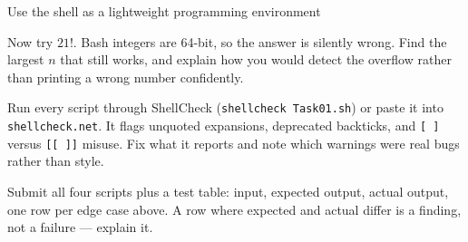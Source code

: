 \begin{labproject}{Use the shell as a lightweight programming environment}
\begin{tryit}
Now try $21!$. Bash integers are 64-bit, so the answer is silently wrong. Find the largest $n$ that still works, and explain how you would detect the overflow rather than printing a wrong number confidently.
\end{tryit}

\begin{debugtask}
Run every script through ShellCheck (\texttt{shellcheck Task01.sh}) or paste it into \texttt{shellcheck.net}. It flags unquoted expansions, deprecated backticks, and \texttt{[ ]} versus \texttt{[[ ]]} misuse. Fix what it reports and note which warnings were real bugs rather than style.
\end{debugtask}
\end{labproject}

\begin{labdeliverable}
Submit all four scripts plus a test table: input, expected output, actual output, one row per edge case above. A row where expected and actual differ is a finding, not a failure --- explain it.
\end{labdeliverable}
